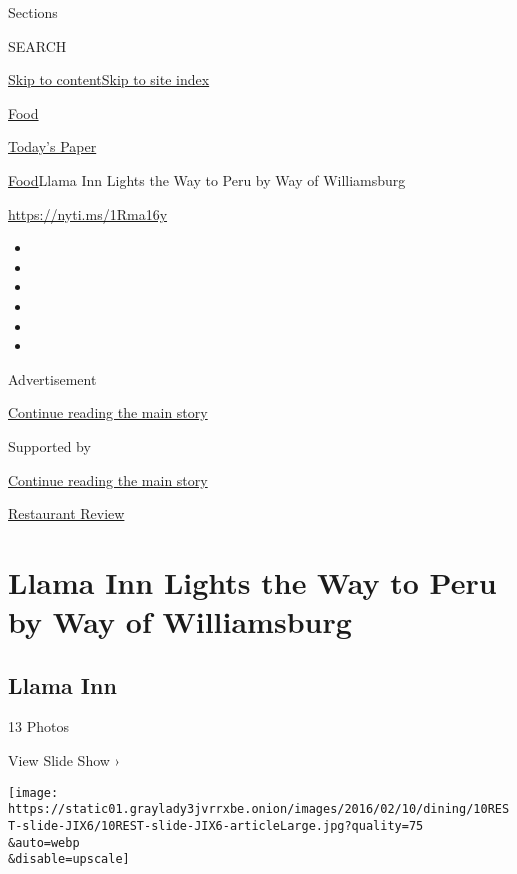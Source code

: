 Sections

SEARCH

\protect\hyperlink{site-content}{Skip to
content}\protect\hyperlink{site-index}{Skip to site index}

\href{https://www.nytimes3xbfgragh.onion/section/food}{Food}

\href{https://myaccount.nytimes3xbfgragh.onion/auth/login?response_type=cookie\&client_id=vi}{}

\href{https://www.nytimes3xbfgragh.onion/section/todayspaper}{Today's
Paper}

\href{/section/food}{Food}\textbar{}Llama Inn Lights the Way to Peru by
Way of Williamsburg

\url{https://nyti.ms/1Rma16y}

\begin{itemize}
\item
\item
\item
\item
\item
\item
\end{itemize}

Advertisement

\protect\hyperlink{after-top}{Continue reading the main story}

Supported by

\protect\hyperlink{after-sponsor}{Continue reading the main story}

\href{/column/restaurant-review}{Restaurant Review}

\hypertarget{llama-inn-lights-the-way-to-peru-by-way-of-williamsburg}{%
\section{Llama Inn Lights the Way to Peru by Way of
Williamsburg}\label{llama-inn-lights-the-way-to-peru-by-way-of-williamsburg}}

\href{https://www.nytimes3xbfgragh.onion/slideshow/2016/02/10/dining/llama-inn.html}{}

\hypertarget{llama-inn}{%
\subsection{Llama Inn}\label{llama-inn}}

13 Photos

View Slide Show ›

\texttt{[image: https://static01.graylady3jvrrxbe.onion/images/2016/02/10/dining/10REST-slide-JIX6/10REST-slide-JIX6-articleLarge.jpg?quality=75\\\&auto=webp\\\&disable=upscale]}

